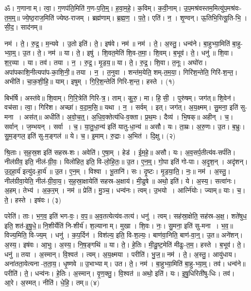 
ॐ। ग॒णानाम्। त्वा॒। ग॒णप॑ति॒मिति॑ ग॒ण-प॒ति॒म्॒। ह॒वा॒म॒हे॒। क॒विम्। क॒वी॒नाम्। उ॒प॒मश्र॑वस्तम॒मित्यु॑प॒मश्र॑वः-त॒म॒म्॒॥ 
ज्ये॒ष्ठ॒राज॒मिति॑ ज्येष्ठ-राजम्। ब्रह्म॑णाम्। ब्र॒ह्म॒ण॒। प॒ते॒। एति॑। न॒। शृ॒ण्वन्। ऊ॒तिभि॒रित्यू॒ति-भि॒। सी॒द॒। साद॑नम्॥ 


नम॑। ते॒। रु॒द्र॒। म॒न्यवे। उ॒तो इति॑। ते॒। इष॑वे। नम॑॥ 
नम॑। ते॒। अ॒स्तु॒। धन्व॑ने। बा॒हुभ्या॒मिति॑ बा॒हु-भ्या॒म्॒। उ॒त। ते॒। नम॑॥ 
या। ते॒। इषु॑। शि॒वत॒मेति॑ शि॒व-त॒मा॒। शि॒वम्। ब॒भूव॑। ते॒। धनु॑॥ 
शि॒वा। श॒र॒व्या। या। तव॑। तया। न॒। रु॒द्र॒। मृ॒ड॒य॒॥ 
या। ते॒। रु॒द्र॒। शि॒वा। त॒नूः। अघो॑रा। अपा॑पकाशि॒नीत्यपा॑प-का॒शि॒नी॒॥ 
तया। न॒। त॒नुवा। शन्त॑म॒येति॒ शम्-त॒म॒या॒। गिरि॑श॒न्तेति॒ गिरि॑-श॒न्त॒। अभीति॑। चा॒क॒शी॒हि॒॥ 
याम्। इषुम्। गि॒रि॒श॒न्तेति॑ गिरि-श॒न्त॒। हस्ते। (१)


बिभ॑र्षि। अस्त॑वे॥ 
शि॒वाम्। गि॒रि॒त्रेति॑ गिरि-त्र॒। ताम्। कु॒रु॒। मा। हि॒सी॒। पुरु॑षम्। जग॑त्॥ 
शि॒वेन॑। वच॑सा। त्वा॒। गिरि॑श। अच्छा॑। व॒दा॒म॒सि॒॥ 
यथा। न॒। सर्वम्। इत्। जग॑त्। अ॒य॒क्ष्मम्। सु॒मना॒ इति॑ सु-मना। अस॑त्॥ 
अधीति॑। अ॒वो॒च॒त्॒। अ॒धि॒व॒क्तेत्य॑धि-व॒क्ता। प्र॒थ॒मः। दैव्य॑। भि॒षक्॥ 
अहीन्। च॒। सर्वान्। ज॒म्भयन्। सर्वा। च॒। या॒तु॒धा॒न्य॑ इति॑ यातु-धा॒न्य॑॥ 
असौ। यः। ता॒म्रः। अ॒रु॒णः। उ॒त। ब॒भ्रुः। सु॒म॒ङ्गल॒ इति॑ सु-म॒ङ्गल॑॥ 
ये। च॒। इ॒माम्। रु॒द्राः। अ॒भित॑। दि॒क्षु। (२)


श्रि॒ताः। स॒ह॒स्र॒श इति॑ सहस्र-शः। अवेति॑। ए॒षा॒म्। हेड॑। ई॒म॒हे॒॥ 
असौ। यः। अ॒व॒सर्प॒तीत्य॑व-सर्प॑ति। नील॑ग्रीव॒ इति॒ नील॑-ग्री॒वः॒। विलो॑हित॒ इति॒ वि-लो॒हि॒तः॒॥ 
उ॒त। ए॒न॒म्॒। गो॒पा इति॑ गो-पाः। अ॒दृ॒श॒न्। अदृ॑शन्। उ॒द॒हा॒र्य॑ इत्यु॑द-हा॒र्य॑॥ 
उ॒त। ए॒न॒म्। विश्वा। भू॒तानि॑। सः। दृ॒ष्टः। मृ॒ड॒या॒ति॒। नः॒॥ 
नम॑। अ॒स्तु॒। नील॑ग्रीवा॒येति॒ नील॑-ग्री॒वा॒य॒। स॒ह॒स्रा॒क्षायेति॑ सहस्र-अ॒क्षाय॑। मी॒ढुषे॥
अथो॒ इति॑। ये। अ॒स्य॒। सत्वा॑नः। अ॒हम्। तेभ्य॑। अ॒क॒र॒म्। नम॑॥ 
प्रेति॑। मु॒ञ्च॒। धन्व॑नः। त्वम्। उ॒भयो। आर्त्नि॑योः। ज्याम्॥ 
याः। च॒। ते॒। हस्ते। इष॑वः। (३)


परेति॑। ताः। भ॒ग॒व॒ इति॑ भग-वः॒। व॒प॒॥ 
अ॒व॒तत्येत्य॑व-तत्य॑। धनु॑। त्वम्। सह॑स्रा॒क्षेति॒ सह॑स्र-अ॒क्ष॒। शते॑षुध॒ इति॒ शत॑-इ॒षु॒धे॒॥ 
नि॒शीर्येति॑ नि-शीर्य॑। श॒ल्यानाम्। मुखा। शि॒वः। नः॒। सु॒मना॒ इति॑ सु-मना। भ॒व॒॥ 
विज्य॒मिति॒ वि-ज्य॒म्। धनु॑। क॒प॒र्दिन॑। विश॑ल्य॒ इति॒ वि-श॒ल्यः॒। बाण॑वा॒निति॒ बाण॑-वा॒न्॒। उ॒त॥ 
अने॑शन्। अ॒स्य॒। इष॑वः। आ॒भुः। अ॒स्य॒। नि॒ष॒ङ्गथि॑॥ 
या। ते॒। हे॒तिः। मी॒ढु॒ष्ट॒मेति॑ मीढुः-त॒म॒। हस्ते। ब॒भूव॑। ते॒। धनु॑॥ 
तया। अ॒स्मान्। वि॒श्वत॑। त्वम्। अ॒य॒क्ष्मया। परीति॑। भु॒ज॒॥ 
नम॑। ते॒। अ॒स्तु॒। आयु॑धाय। अना॑तता॒येत्यना-त॒ता॒य॒। धृ॒ष्णवे॥ 
उ॒भाभ्याम्। उत। ते॒। नम॑। बा॒हुभ्या॒मिति॑ बा॒हु-भ्या॒म्॒। तव॑। धन्व॑ने॥ 
परीति॑। ते॒। धन्व॑नः। हे॒तिः। अ॒स्मान्। वृ॒ण॒क्तु॒। वि॒श्वत॑॥
 अथो॒ इति॑। यः। इ॒षु॒धिरिती॑षु-धिः। तव॑। आ॒रे। अ॒स्मत्। नीति॑। धे॒हि॒। तम्॥ (४)


